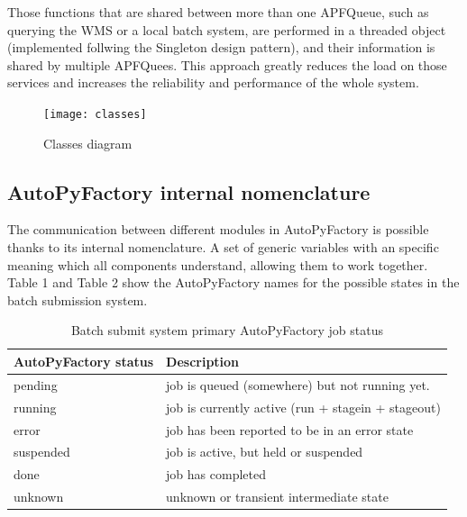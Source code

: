 \documentclass[a4paper]{jpconf}
\begin{document}
Those functions that are shared between more than one APFQueue, such
as querying the WMS or a local batch system,
are performed in a threaded object (implemented follwing the Singleton design
pattern), and their information is shared by multiple APFQuees. This approach
greatly reduces the load on those services and increases the reliability and performance of the whole system.


\begin{figure}[h]
\centering\texttt{[image: classes]}
\caption{Classes diagram}
\label{classes}
\end{figure}

\subsection{AutoPyFactory internal nomenclature}

The communication between different modules in AutoPyFactory 
is possible thanks to its internal nomenclature.
A set of generic variables with an specific meaning which all components 
understand, allowing them to work together. 
Table 1 and Table 2 show the AutoPyFactory names for the
possible states in the batch submission system. 

\begin{table}[h]
   \begin{center}
      \begin{tabular}{l l}
         \hline
         \textbf{AutoPyFactory status} & \textbf{Description} \\ 
         \hline
         pending      &     job is queued (somewhere) but not running yet.      \\  
         running      &     job is currently active (run + stagein + stageout)  \\ 
         error        &     job has been reported to be in an error state       \\ 
         suspended    &     job is active, but held or suspended                \\ 
         done         &     job has completed                                   \\ 
         unknown      &     unknown or transient intermediate state             \\ 
         \hline
      \end{tabular}
   \end{center}
   \caption{Batch submit system primary AutoPyFactory job status}
   \label{job secondary status}
\end{table}
\end{document}
